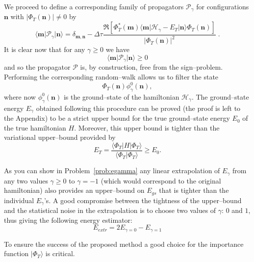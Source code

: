We proceed to define a corresponding family of propagators $\mathcal{P}_{\gamma}$ for configurations $\mathbf{n}$ with $|\Phi_T(\mathbf{n})| \neq 0$ by
\begin{equation}
\label{eq:CIMC_IS_prop}
\langle \mathbf{m} \lvert \mathcal{P}_{\gamma} \rvert \mathbf{n} \rangle = \delta_{\mathbf{m},\mathbf{n}} - \Delta\tau \frac{\Re \left[ \Phi^*_T(\mathbf{m}) \langle \mathbf{m} \lvert \mathcal{H}_{\gamma} - E_T \rvert \mathbf{n} \rangle \Phi_T(\mathbf{n}) \right]}{\lvert \Phi_T(\mathbf{n}) \rvert^2}\; .
\end{equation}
It is clear now that for any $\gamma \geq 0$ we have 
\begin{equation}
\langle \mathbf{m} \lvert \mathcal{P}_{\gamma} \rvert \mathbf{n} \rangle \geq 0 
\end{equation}
and so the propagator $\mathcal{P}$ is, by construction, free from the sign--problem. Performing the corresponding random--walk allows us to filter the state
\begin{equation}
\Phi_T(\mathbf{n})\phi_{\gamma}^0(\mathbf{n}) ,
\end{equation}
where now $\phi_{\gamma}^0(\mathbf{n})$ is the ground--state of the hamiltonian $\mathcal{H}_{\gamma}$. The ground--state energy $E_{\gamma}$ 
obtained following this procedure can be proved (the proof is left to the Appendix) to be a strict upper bound for the true ground--state 
energy $E_{0}$ of the true hamiltonian $H$. Moreover, this upper bound is tighter than the variational upper--bound provided by 
\begin{equation}
E_T = \frac{\langle \Phi_T \lvert H \rvert \Phi_T \rangle}{\langle \Phi_T \vert \Phi_T \rangle} \ge E_0 .
\end{equation}

As you can show in Problem~\ref{prob:egamma} any linear extrapolation of $E_{\gamma}$ from any two values $\gamma \geq 0$ to $\gamma = -1$ (which would correspond to the original hamiltonian) also
provides an upper--bound on $E_{gs}$ that is tighter than the individual $E_{\gamma}$'s. A good compromise between the tightness of the upper--bound and the statistical noise in
the extrapolation is to choose two values of $\gamma$: $0$ and $1$, thus giving the following energy estimator:
\begin{equation}
\label{cimc_extrap}
E_{extr} = 2 E_{\gamma=0} - E_{\gamma=1}
\end{equation}

To ensure the success of the proposed method a good choice for the importance function $\rvert \Phi_T \rangle$ is critical.

